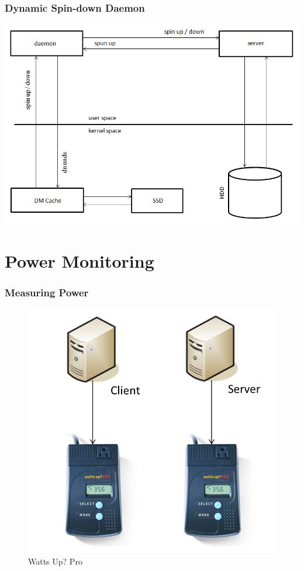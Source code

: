 \documentclass{beamer}
\begin{document}
\begin{frame}
  \frametitle{Dynamic Spin-down Daemon}

  \centering
  \includegraphics[height=0.8\textheight,keepaspectratio]{daemon.png}

\end{frame}

\section{Power Monitoring}

\begin{frame}
  \frametitle{Measuring Power}

  \begin{figure}
    \centering
    \includegraphics[height=0.6\textheight,keepaspectratio]{wattsup.png}
    {\caption*{Watts Up? Pro}}
  \end{figure}

\end{frame}
\end{document}
